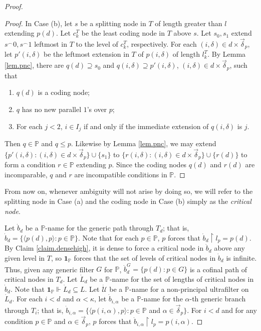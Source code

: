\documentclass{amsart}
\theoremstyle{remark}
\theoremstyle{definition}
\theoremstyle{remark}
\newcommand{\al}{\alpha}
\newcommand{\sse}{\subseteq}
\newcommand{\contains}{\supseteq}
\newcommand{\forces}{\Vdash}
\newcommand{\re}{\restriction}
\newcommand{\bP}{\mathbb{P}}
\newcommand{\lgl}{\langle}
\newcommand{\rgl}{\rangle}
\begin{document}
\begin{proof}
\begin{proof}
In Case (b),
let $s$ be a splitting node in $T$ of length greater than $l$ extending $p(d)$.
Let $c^T_k$ be the least coding node in $T$ above $s$.
Let $s_0,s_1$ extend $s^{\frown}0,s^{\frown}1$ leftmost in $T$  to the level of $c^T_k$, respectively.
For each $(i,\delta)\in d\times\vec\delta_p$,
let $p'(i,\delta)$ be the leftmost extension  in $T$ of $p(i,\delta)$ of length $l^T_k$.
 By  Lemma \ref{lem.pnc},
there are  $q(d)\contains s_0$ and   $q(i,\delta)\contains p'(i,\delta)$, $(i,\delta)\in d\times \vec{\delta}_p$,
such that
\begin{enumerate}
\item
 $q(d)$ is a coding node;
\item
$q$ has no new  parallel $1$'s over  $p$;
\item
 For each $j<2$,
$i\in I_j$ if and only if the immediate extension of $q(i,\delta)$ is $j$.
\end{enumerate}
Then $q\in \bP$ and $q\le p$.
Likewise  by  Lemma \ref{lem.pnc},
we may extend $\{p'(i,\delta): (i,\delta)\in d\times \vec{\delta}_p\}\cup\{s_1\}$
to
$\{ r(i,\delta):(i,\delta)\in d\times \vec{\delta}_p\}\cup\{r(d)\}$ to form a condition $r\in\bP$ extending $p$.
Since the coding nodes $q(d)$ and $r(d)$ are incomparable, $q$ and $r$  are incompatible conditions in $\bP$.
\end{proof}




From now on, whenever
 ambiguity will  not arise by doing so,
we will  refer to the splitting node in Case (a) and the coding node in Case (b)   simply as the
{\em critical node}.


Let $\dot{b}_d$ be a $\bP$-name for the generic path through $T_d$;
that is, $\dot{b}_d=\{\lgl p(d),p\rgl:p\in\bP\}$.
Note that for each $p\in \bP$, $p$ forces that $\dot{b}_d\re l_p= p(d)$.
By Claim \ref{claim.densehigh}, it is dense to force a critical node in $\dot{b}_d$ above any given level in $T$,  so $\mathbf{1}_{\bP}$ forces that the set of levels of critical nodes in $\dot{b}_d$ is infinite.
Thus, given any generic  filter  $G$  for $\bP$, $\dot{b}_d^G=\{p(d):p\in G\}$ is a cofinal path of critical nodes in $T_d$.
Let $\dot{L}_d$ be a $\bP$-name for the set of lengths of critical  nodes in $\dot{b}_d$.
Note that $\mathbf{1}_{\bP}\forces \dot{L}_d\sse L$.
Let $\dot{\mathcal{U}}$ be a $\bP$-name for a non-principal ultrafilter on $\dot{L}_d$.
For each $i<d$ and $\al<\kappa$,  let $\dot{b}_{i,\al}$ be a $\bP$-name for the $\al$-th generic branch through $T_i$;
that is, $\dot{b}_{i,\al}=\{\lgl p(i,\al),p\rgl:p\in \bP$ and $\al\in\vec{\delta}_p\}$.
For $i<d$ and
 for any condition $p\in \bP$ and  $\al\in \vec\delta_p$,  $p$ forces that $\dot{b}_{i,\al}\re l_p= p(i,\al)$.





\end{proof}
\end{document}
